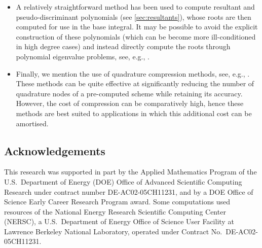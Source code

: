 \documentclass[onefignum,onetabnum,onealgnum,oneeqnum]{siamart190516}
\begin{document}
\begin{itemize}
\item A relatively straightforward method has been used to compute resultant and pseudo-discriminant polynomials (see \cref{sec:resultants}), whose roots are then computed for use in the base integral. It may be possible to avoid the explicit construction of these polynomials (which can be become more ill-conditioned in high degree cases) and instead directly compute the roots through polynomial eigenvalue problems, see, e.g., \cite{Nakatsukasa2015,doi:10.1137/15M1022513}.
\item Finally, we mention the use of quadrature compression methods, see, e.g., \cite{doi:10.1137/16M1085206}. These methods can be quite effective at significantly reducing the number of quadrature nodes of a pre-computed scheme while retaining its accuracy. However, the cost of compression can be comparatively high, hence these methods are best suited to applications in which this additional cost can be amortised.
\end{itemize}










\subsection*{Acknowledgements} This research was supported in part by the Applied Mathematics Program of the U.S.~Department of Energy (DOE) Office of Advanced Scientific Computing Research under contract number DE-AC02-05CH11231, and by a DOE Office of Science Early Career Research Program award. Some computations used resources of the National Energy Research Scientific Computing Center (NERSC), a U.S.~Department of Energy Office of Science User Facility at Lawrence Berkeley National Laboratory, operated under Contract No.~DE-AC02-05CH11231.











\end{document}
